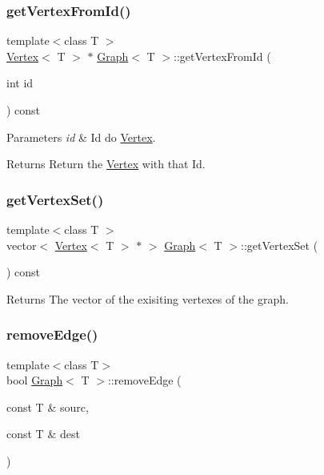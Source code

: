 \subsubsection{\texorpdfstring{get\+Vertex\+From\+Id()}{getVertexFromId()}}
{\footnotesize\ttfamily template$<$class T $>$ \\
\hyperlink{class_vertex}{Vertex}$<$ T $>$ $\ast$ \hyperlink{class_graph}{Graph}$<$ T $>$\+::get\+Vertex\+From\+Id (\begin{DoxyParamCaption}\item[{int}]{id }\end{DoxyParamCaption}) const}


\begin{DoxyParams}{Parameters}
{\em id} & Id do \hyperlink{class_vertex}{Vertex}.\\
\hline
\end{DoxyParams}
\begin{DoxyReturn}{Returns}
Return the \hyperlink{class_vertex}{Vertex} with that Id. 
\end{DoxyReturn}
\mbox{\label{class_graph_a923b43995f81ad9319bbc81a1e433e64}} 
\subsubsection{\texorpdfstring{get\+Vertex\+Set()}{getVertexSet()}}
{\footnotesize\ttfamily template$<$class T $>$ \\
vector$<$ \hyperlink{class_vertex}{Vertex}$<$ T $>$ $\ast$ $>$ \hyperlink{class_graph}{Graph}$<$ T $>$\+::get\+Vertex\+Set (\begin{DoxyParamCaption}{ }\end{DoxyParamCaption}) const}

\begin{DoxyReturn}{Returns}
The vector of the exisiting vertexes of the graph. 
\end{DoxyReturn}
\mbox{\label{class_graph_a1106092a37366486cf55576f9ec01692}} 
\subsubsection{\texorpdfstring{remove\+Edge()}{removeEdge()}}
{\footnotesize\ttfamily template$<$class T$>$ \\
bool \hyperlink{class_graph}{Graph}$<$ T $>$\+::remove\+Edge (\begin{DoxyParamCaption}\item[{const T \&}]{sourc,  }\item[{const T \&}]{dest }\end{DoxyParamCaption})}

